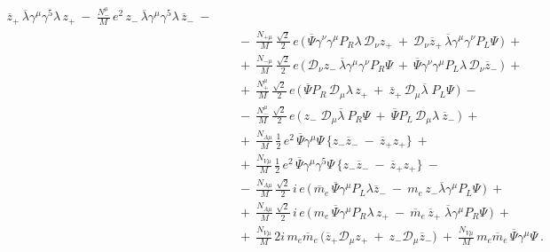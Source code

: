 \documentclass[12pt]{revtex4}
\begin{document}
\begin{eqnarray}
\overline{z}_+ \, \overline{\lambda} \gamma^\mu \gamma^5 
\lambda\, z_+ 
~-~
\frac{N_-^\mu}{M}\, e^2\,
z_-\, \overline{\lambda}\gamma^\mu\gamma^5
\lambda\, \overline{z}_-
~-~ \\
\nonumber
&&
~-~
\frac{N_{+\mu}}{M}\,
\frac{\sqrt{2}}{2}\, e\,
\Big(\,
\overline{\Psi} \gamma^\nu\gamma^\mu P_R
\lambda \, \mathcal{D}_\nu z_+ 
~+~
\mathcal{D}_\nu \overline{z}_+ \,
\overline{\lambda} \gamma^\mu \gamma^\nu
P_L \Psi
\,
\Big)
~+~ \\
\nonumber
&&
~+~
\frac{N_{-\mu}}{M}\,
\frac{\sqrt{2}}{2}\,e\,
\Big(\,
\mathcal{D}_\nu z_- \,
\overline{\lambda}\gamma^\mu\gamma^\nu P_R \Psi
~+~
\overline{\Psi}\gamma^\nu\gamma^\mu P_L \lambda
\, \mathcal{D}_\nu \overline{z}_-
\,
\Big)
~+~ \\
\label{LV_matter_component}
&&
~+~
\frac{N_+^\mu}{M}\,
\frac{\sqrt{2}}{2}\, e\,
\Big(\,
\overline{\Psi}P_R\, \mathcal{D}_\mu \lambda
\, z_+ 
~+~
\overline{z}_+ \,
\mathcal{D}_\mu 
\overline{\lambda}\; P_L \Psi
\,\Big)
~-~ \\
\nonumber
&&
~-~
\frac{N_-^\mu}{M}\,
\frac{\sqrt{2}}{2}\, e\,
\Big(\,
z_-\; \mathcal{D}_\mu \overline{\lambda} ~
P_R \Psi 
~+~
\overline{\Psi} P_L \, \mathcal{D}_\mu \lambda ~
\overline{z}_-
\,\Big) 
~+~ \\
\nonumber
&&
~+~ 
\frac{N_{A\mu}}{M}\,
\frac{1}{2}\, e^2\,
\overline{\Psi}\gamma^\mu  \Psi \,
\Big\{
  z_-  \overline{z}_- 
  ~-~
  \overline{z}_+  z_+
\Big\}
~+~ \\
\nonumber
&&
~+~
\frac{N_{V\mu}}{M}\,
\frac{1}{2}\, e^2\,
\overline{\Psi}\gamma^\mu \gamma^5 \Psi \,
\Big\{
  z_-  \overline{z}_- 
  ~-~
  \overline{z}_+  z_+
\Big\}
~-~ \\
\nonumber
&&
~-~
\frac{N_{A\mu}}{M}\,
\frac{\sqrt{2}}{2}\, i\, e\,
\Big(\,
\overline{m}_e\, \overline{\Psi} \gamma^\mu P_L
\lambda \overline{z}_- 
~-~
m_e\, z_- \overline{\lambda}
\gamma^\mu P_L \Psi
\,\Big)
~+~ \\
\nonumber
&&
~+~
\frac{N_{A\mu}}{M}\,
\frac{\sqrt{2}}{2}\, i\, e\,
\Big(\,
m_e\, \overline{\Psi}\gamma^\mu P_R \lambda\, z_+ 
~-~
\overline{m}_e\, \overline{z}_+\; \overline{\lambda}
\gamma^\mu P_R \Psi
\,\Big)
~+~ \\
\nonumber
&&
~+~ 
\frac{N_{V\mu}}{M}\, 2 i\, m_e \overline{m}_e \,
\big( 
\overline{z}_+ \mathcal{D}_\mu z_+ 
~+~
z_- \mathcal{D}_\mu \overline{z}_-
\big)~+~
\frac{N_{V\mu}}{M}\,
m_e \overline{m}_e \,
\overline{\Psi} \gamma^\mu \Psi
~.
\end{eqnarray}
\end{document}
